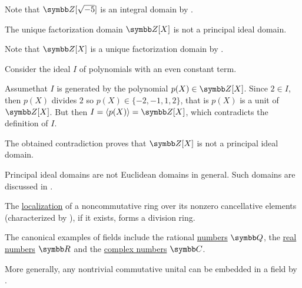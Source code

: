 \begin{example}
\begin{RefList}
    Note that \( \BZ[\sqrt{-5}] \) is an integral domain by .

    \cite{ProofWiki:polynomials_in_integers_is_not_principal_ideal_domain} The unique factorization domain \( \BZ[X] \) is not a principal ideal domain.

    Note that \( \BZ[X] \) is a unique factorization domain by .

    Consider the ideal \( I \) of polynomials with an even constant term.

    Assume\LEM that \( I \) is generated by the polynomial \( p(X) \in \BZ[X] \). Since \( 2 \in I \), then \( p(X) \) divides \( 2 \) so \( p(X) \in \{ -2, -1, 1, 2 \} \), that is \( p(X) \) is a unit of \( \BZ[X] \). But then \( I = \Gen{p(X)} = \BZ[X] \), which contradicts the definition of \( I \).

    The obtained contradiction proves that \( \BZ[X] \) is not a principal ideal domain.

     Principal ideal domains are not Euclidean domains in general. Such domains are discussed in \cite{Anderson1986}.

     The \hyperref[def:ring_localization]{localization} of a noncommutative ring over its nonzero cancellative elements (characterized by ), if it exists, forms a division ring.

     The canonical examples of fields include the rational \hyperref[def:rational_numbers]{numbers} \( \BQ \), the \hyperref[def:real_numbers]{real numbers} \( \BR \) and the \hyperref[def:complex_numbers]{complex numbers} \( \BC \).

    More generally, any nontrivial commutative unital can be embedded in a field by .
  \end{RefList}
\end{example}

